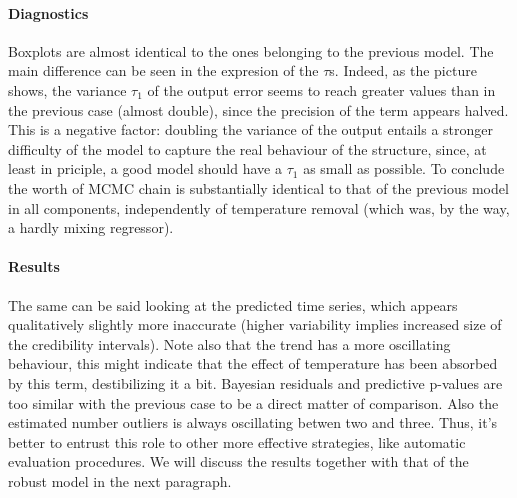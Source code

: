 \documentclass[11pt,twoside]{report}
\begin{document}
\paragraph{Diagnostics} Boxplots are almost identical to the ones belonging to the previous model. The main difference can be seen in the 
expresion of the $ \tau $s. Indeed, as the picture shows, the variance $ \tau_1 $ of the output error seems to reach greater values than in the previous case (almost double), since the precision of the term appears halved. This is a negative factor: doubling the variance of the output entails a stronger difficulty of the model to capture the real behaviour of the structure, since, at least in priciple, a good model should have a $ \tau_1 $ as small as possible. To conclude the worth of MCMC chain is substantially identical to that of the previous model in all components, independently of temperature removal (which was, by the way, a hardly mixing regressor).


\paragraph{Results} The same can be said looking at the predicted time series, which appears qualitatively slightly more inaccurate (higher variability implies increased size of the credibility intervals). Note also that the trend has a more oscillating behaviour, this might indicate that the effect of temperature has been absorbed by this term, destibilizing it a bit. Bayesian residuals and predictive p-values are too similar with the previous case to be a direct matter of comparison. Also the estimated number outliers is always oscillating betwen two and three. Thus, it's better to entrust this role to other more effective strategies, like automatic evaluation procedures. We will discuss the results together with that of the robust model in the next paragraph.
\end{document}
